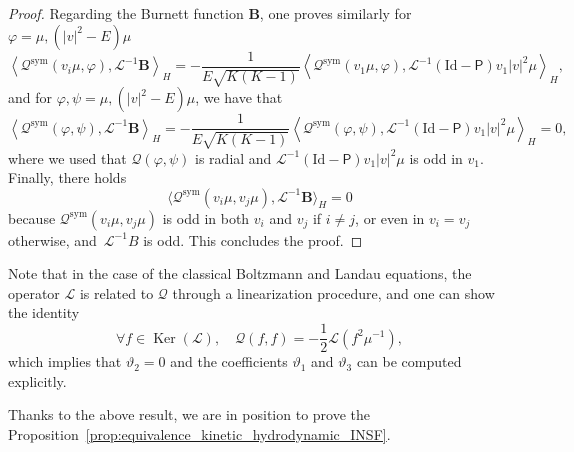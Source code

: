 \documentclass[AHL,Unicode,longabstracts,published]{cedram}
\DeclareMathOperator{\nul}{Ker}
\newcommand{\sym}{\mathrm{sym}}
\newcommand{\Id}{\mathrm{Id}}
\newcommand{\BurB}{{\mathbf{B}}}
\newcommand{\LL}{\mathcal{L}}
\newcommand{\PP}{\mathsf{P}}
\newcommand{\QQ}{\mathcal{Q}}
\newcommand{\Ss}{H}
\newcommand{\la}{\langle}
\newcommand{\ra}{\rangle}
\let\oldforall\forall
\renewcommand*{\forall}{\mathrel{\oldforall}}
\begin{document}
\begin{proof}
Regarding the Burnett function $\BurB $, one proves similarly for $\varphi = \mu, (|v|^2 - E) \mu$
\[
\left\la \QQ^\sym(v_i \mu, \varphi), \LL^{-1}\BurB \right\ra_{\Ss} = - \dfrac{1}{E \sqrt{K (K-1)}} \left\la \QQ^\sym(v_1 \mu, \varphi), \LL^{-1} \left(\Id - \PP \right) v_1 |v|^2 \mu \right\ra_{\Ss},
\]
and for $\varphi, \psi = \mu, (|v|^2 - E) \mu$, we have that
\[
\left\la \QQ^\sym(\varphi, \psi), \LL^{-1}\BurB \right\ra_{\Ss} = - \dfrac{1}{E \sqrt{K (K-1)}} \left\la \QQ^\sym(\varphi, \psi), \LL^{-1} \left(\Id - \PP \right) v_1 |v|^2 \mu \right\ra_{\Ss} = 0,
\]
where we used that $\QQ(\varphi, \psi)$ is radial and $\LL^{-1}(\Id - \PP) v_1 |v|^2 \mu$ is odd in $v_1$. Finally, there holds
\[
\la \QQ^\sym(v_i \mu, v_j \mu), \LL^{-1}\BurB \ra_\Ss = 0
\]
because $\QQ^\sym(v_i \mu, v_j \mu)$ is odd in both $v_i$ and $v_j$ if $i \neq j$, or even in $v_i = v_j$ otherwise, and~$\LL^{-1} B$ is odd. This concludes the proof.
\end{proof}

\begin{rema}
Note that in the case of the classical Boltzmann and Landau equations, the operator $\LL$ is related to $\QQ$ through a linearization procedure, and one can show the identity
\[
\forall f \in \nul(\LL), \quad \QQ(f, f) = - \frac{1}{2} \LL \left(f^2 \mu^{-1} \right),
\]
which implies that $\vartheta_2 = 0$ and the coefficients $\vartheta_1$ and $\vartheta_3$ can be computed explicitly.
\end{rema}


Thanks to the above result, we are in position to prove the Proposition~\ref{prop:equivalence_kinetic_hydrodynamic_INSF}.
\end{document}
